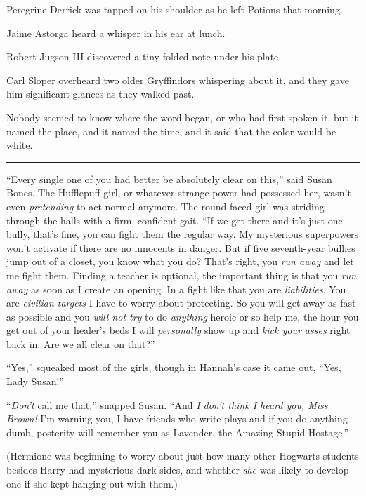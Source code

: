 Peregrine Derrick was tapped on his shoulder as he left Potions that morning.

Jaime Astorga heard a whisper in his ear at lunch.

Robert Jugson III discovered a tiny folded note under his plate.

Carl Sloper overheard two older Gryffindors whispering about it, and they gave him significant glances as they walked past.

Nobody seemed to know where the word began, or who had first spoken it, but it named the place, and it named the time, and it said that the color would be white.

\begin{center}\rule{3in}{0.4pt}\end{center}

``Every single one of you had better be absolutely clear on this,'' said Susan Bones. The Hufflepuff girl, or whatever strange power had possessed her, wasn't even \emph{pretending} to act normal anymore. The round-faced girl was striding through the halls with a firm, confident gait. ``If we get there and it's just one bully, that's fine, you can fight them the regular way. My mysterious superpowers won't activate if there are no innocents in danger. But if five seventh-year bullies jump out of a closet, you know what you do? That's right, you \emph{run away} and let me fight them. Finding a teacher is optional, the important thing is that you \emph{run away} as soon as I create an opening. In a fight like that you are \emph{liabilities}. You are \emph{civilian targets} I have to worry about protecting. So you will get away as fast as possible and you \emph{will not try} to do \emph{anything} heroic or so help me, the hour you get out of your healer's beds I will \emph{personally} show up and \emph{kick your asses} right back in. Are we all clear on that?''

``Yes,'' squeaked most of the girls, though in Hannah's case it came out, ``Yes, Lady Susan!''

``\emph{Don't} call me that,'' snapped Susan. ``And \emph{I don't think I heard you, Miss Brown!} I'm warning you, I have friends who write plays and if you do anything dumb, posterity will remember you as Lavender, the Amazing Stupid Hostage.''

(Hermione was beginning to worry about just how many other Hogwarts students besides Harry had mysterious dark sides, and whether \emph{she} was likely to develop one if she kept hanging out with them.)

